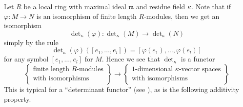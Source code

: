 \noindent
Let $R$ be a local ring with maximal ideal $\mathfrak m$ and
residue field $\kappa$. Note that if $\varphi : M \to N$ is an
isomorphism of finite length $R$-modules, then we get an
isomorphism
$$
\det\nolimits_\kappa(\varphi) :
\det\nolimits_\kappa(M)
\to
\det\nolimits_\kappa(N)
$$
simply by the rule
$$
\det\nolimits_\kappa(\varphi)([e_1, \ldots, e_l])
=
[\varphi(e_1), \ldots, \varphi(e_l)]
$$
for any symbol $[e_1, \ldots, e_l]$ for $M$.
Hence we see that $\det\nolimits_\kappa$ is a functor
\begin{equation}
\label{equation-functor}
\left\{
\begin{matrix}
\text{finite length $R$-modules}\\
\text{with isomorphisms}
\end{matrix}
\right\}
\longrightarrow
\left\{
\begin{matrix}
1\text{-dimensional }\kappa\text{-vector spaces}\\
\text{with isomorphisms}
\end{matrix}
\right\}
\end{equation}
This is typical for a ``determinant functor''
(see \cite{Knudsen}), as is the following additivity
property.

